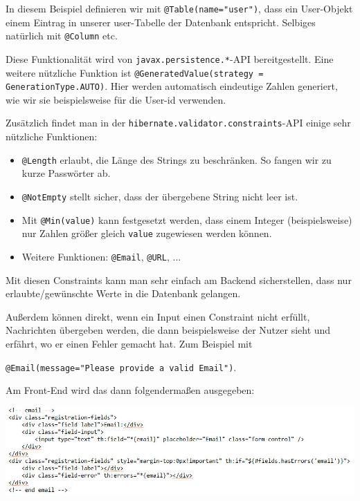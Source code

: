 \documentclass[12pt,a4paper]{article}
\begin{document}
\bigskip
In diesem Beispiel definieren wir mit \texttt{@Table(name="{}user")}, dass ein User-Objekt einem Eintrag in unserer user-Tabelle der Datenbank entspricht. Selbiges natürlich mit \texttt{@Column} etc.

\smallskip
Diese Funktionalität wird von \texttt{javax.persistence.*}-API bereitgestellt. Eine weitere nützliche Funktion ist \texttt{@GeneratedValue(strategy = GenerationType.AUTO)}. Hier werden automatisch eindeutige Zahlen generiert, wie wir sie beispielsweise für die User-id verwenden. 

\bigskip
Zusätzlich findet man in der \texttt{hibernate.validator.constraints}-API einige sehr nützliche Funktionen:
\begin{itemize}
	\item \texttt{@Length} erlaubt, die Länge des Strings zu beschränken. So fangen wir zu kurze Passwörter ab.
	\item \texttt{@NotEmpty} stellt sicher, dass der übergebene String nicht leer ist.
	\item Mit \texttt{@Min(value)} kann festgesetzt werden, dass einem Integer (beispielsweise) nur Zahlen größer gleich \texttt{value} zugewiesen werden können.
	\item Weitere Funktionen: \texttt{@Email}, \texttt{@URL}, ...
\end{itemize}

\bigskip
Mit diesen Constraints kann man sehr einfach am Backend sicherstellen, dass nur erlaubte/gewünschte Werte in die Datenbank gelangen. 

\bigskip
Außerdem können direkt, wenn ein Input einen Constraint nicht erfüllt, Nachrichten übergeben werden, die dann beispielsweise der Nutzer sieht und erfährt, wo er einen Fehler gemacht hat. Zum Beispiel mit

\smallskip
\texttt{@Email(message="Please provide a valid Email")}.

\bigskip
Am Front-End wird das dann folgendermaßen ausgegeben:

\bigskip
\hspace{-2cm}\includegraphics[scale=0.9]{./Graphics/model_front}
\end{document}
